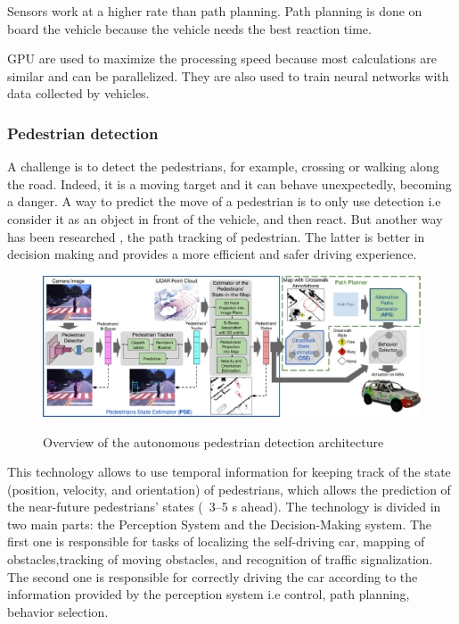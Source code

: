 Sensors work at a higher rate than path planning. Path planning is done on board the vehicle because the vehicle needs the best reaction time.
\smallskip

GPU are used to maximize the processing speed because most calculations are similar and can be parallelized. They are also used to train neural networks with data collected by vehicles.

\subsubsection{Pedestrian detection}

A challenge is to detect the pedestrians, for example, crossing or walking along the road. Indeed, it is a moving target and it can behave unexpectedly, becoming a danger. A way to predict the move of a pedestrian is to only use detection i.e consider it as an object in front of the vehicle,  and then react. But another way has been researched \cite{sarcinelli_handling_2019}, the path tracking of pedestrian. The latter is better in decision making and provides a more efficient and safer driving experience.

\begin{center}
    \begin{figure}[ht!]
        \centering
        
        \includegraphics[width=467px, keepaspectratio]{imports/pedestrian1.jpg}
        
        \caption{Overview of the autonomous pedestrian detection architecture}  \cite{sarcinelli_handling_2019}
    \end{figure}
\end{center}

This technology allows to use temporal information for keeping track of the state (position, velocity, and orientation) of pedestrians, which allows the prediction of the near-future pedestrians' states (~3–5 s ahead).
\smallskip
The technology is divided in two main parts: the Perception System and the Decision-Making system. The first one is responsible for tasks of localizing the self-driving car, mapping of obstacles,tracking of moving obstacles, and recognition of traffic signalization. The second one is responsible for correctly driving the car according to the information provided by the perception system i.e control, path planning, behavior selection. 

